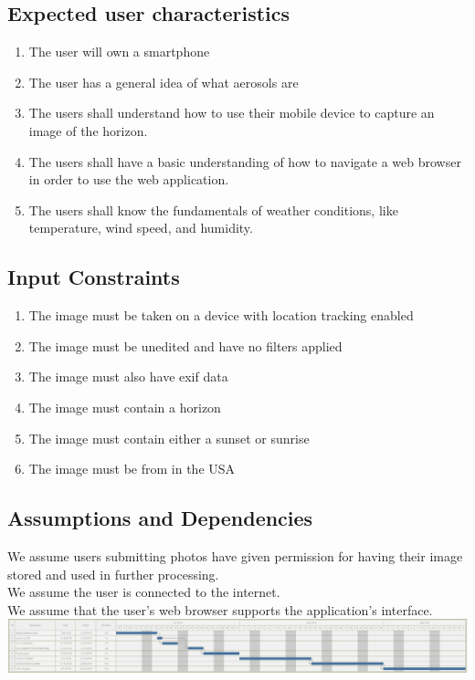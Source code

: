 \documentclass[journal,10pt,draftclsnofoot,onecolumn]{IEEEtran}
\begin{document}
\begin{singlespace}
\subsection{Expected user characteristics}
\begin{enumerate}
\item The user will own a smartphone
\item The user has a general idea of what aerosols are
\item The users shall understand how to use their mobile device to capture an image of the horizon.
\item The users shall have a basic understanding of how to navigate a web browser in order to use the web application.
\item The users shall know the fundamentals of weather conditions, like temperature, wind speed, and humidity.
\end{enumerate}

\subsection{Input Constraints}
\begin{enumerate}
\item The image must be taken on a device with location tracking enabled
\item The image must be unedited and have no filters applied
\item The image must also have exif data
\item The image must contain a horizon
\item The image must contain either a sunset or sunrise
\item The image must be from in the USA
\end{enumerate}

\subsection{Assumptions and Dependencies}
We assume users submitting photos have given permission for having their image stored and used in further processing.\\
We assume the user is connected to the internet.\\
We assume that the user's web browser supports the application's interface.\\
\includegraphics[width=\linewidth]{gantt.png}



\end{singlespace}
\end{document}
